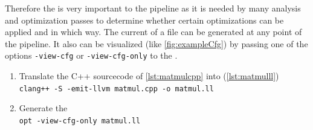 Therefore the \cfg is very important to the pipeline as it is needed by many analysis and optimization passes to determine whether certain optimizations can be applied and in which way.
The current \cfg of a \llvmir file can be generated at any point of the pipeline.
It also can be visualized (like \autoref{fig:exampleCfg}) by passing one of the options \texttt{-view-cfg} or \texttt{-view-cfg-only} to the \opt.
\begin{enumerate}
    \item Translate the C++ sourcecode of \autoref{lst:matmulcpp} into \llvmir (\autoref{lst:matmulll})\\
        \texttt{clang++ -S -emit-llvm matmul.cpp -o matmul.ll}
    \item Generate the \cfg\\
        \texttt{opt -view-cfg-only matmul.ll}
\end{enumerate}
